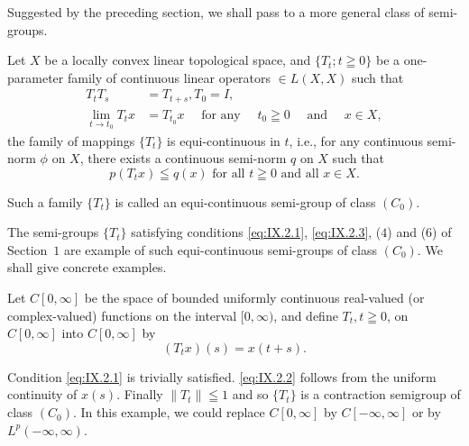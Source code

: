 \label{sec:IX.2}

Suggested by the preceding section, we shall pass to a more general class of semi-groups. 

\begin{definitionu} Let $X$ be a locally convex linear topological space, and $\{T_t; t \geqq 0\}$ be a one-parameter family of continuous linear operators $\in L(X, X)$ such that 
\begin{align}
T _{t} T _{s}& = T _{t+s}, T _{0} = I, \label{eq:IX.2.1} \\
\lim\limits _ {t \rightarrow t _{0}} T _{t} x& = T _ {t _{0}} x \quad \text{ for any } \quad t _{0} \geqq 0 \quad \text{ and } \quad x \in X, \label{eq:IX.2.2}
\end{align}
the family of mappings $\{T_t\}$ is equi-continuous in $t$, 
i.e., for any continuous semi-norm $\phi$ on $X$, there 
exists a continuous semi-norm $q$ on $X$ such that 
\begin{equation}\label{eq:IX.2.3}
p \left(T _{t} x\right) \leqq q (x) \text{ for all } t \geqq 0 \text{ and all } x \in X.
\end{equation}
\end{definitionu}

Such a family $\{T_t\}$ is called an equi-continuous semi-group of class $(C_0)$. 

The semi-groups $\{T_{t}\}$ satisfying conditions \eqref{eq:IX.2.1}, \eqref{eq:IX.2.3}, ($4$) and ($6$) of Section~\hyperref[sec:IX.1]{$1$} are example of such equi-continuous semi-groups of class $(C_0)$. We shall give concrete examples. 

\begin{example}\label{ex:IX.2.Example.1} Let $C[0, \infty]$ be the space of bounded uniformly continuous real-valued (or complex-valued) functions on the interval $[0, \infty)$, and define $T_t, t \geqq 0$, on $C[0, \infty]$ into $C[0, \infty]$ by 
\[
(T _{t} x) (s) = x (t + s).
\]
\end{example}

Condition \eqref{eq:IX.2.1} is trivially satisfied. \eqref{eq:IX.2.2} follows from the uniform continuity of $x(s)$. Finally $\|T_t\| \leqq 1$ and so $\{T_t\}$ is a contraction semigroup of class $(C_0)$. In this example, we could replace $C[0,\infty]$ by $C[-\infty, \infty]$ or by $L^p(-\infty, \infty)$. 

